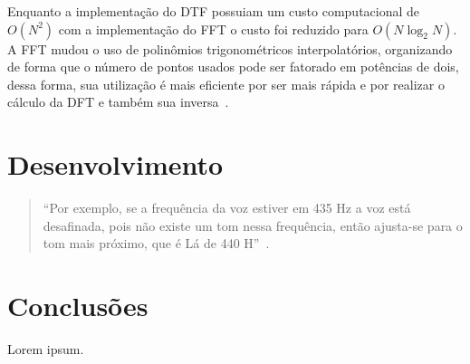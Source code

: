 \documentclass{sbrt}
\begin{document}
Enquanto a implementação do DTF possuiam um custo computacional de $O(N^2)$ com a implementação do FFT o custo foi
reduzido para $O(N \log_2{N})$. A FFT mudou o uso de polinômios trigonométricos interpolatórios, organizando de forma
que o número de pontos usados pode ser fatorado em potências de dois, dessa forma, sua utilização é mais eficiente por
ser mais rápida e por realizar o cálculo da DFT e também sua inversa~\cite{reis2008implementaccao}.


\section{Desenvolvimento}

\begin{quote}
  ``Por exemplo, se a frequência da voz estiver em 435 Hz a voz está desafinada, pois não existe um tom nessa
  frequência, então ajusta-se para o tom mais próximo, que é Lá de 440 H''~\cite{deimplementaccao}.
\end{quote}


\section{Conclusões}

Lorem ipsum.





\end{document}
